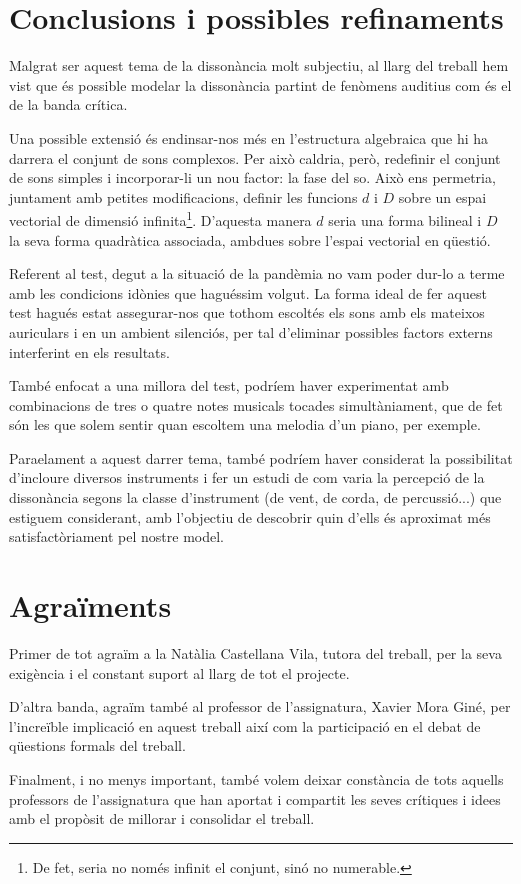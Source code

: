 \documentclass{article}
\theoremstyle{math}
\theoremstyle{TheoremNum}
\newcommand{\0}{\ensuremath{\vb{0}}}
\begin{document}
\section{Conclusions i possibles refinaments}
Malgrat ser aquest tema de la dissonància molt subjectiu, al llarg del treball hem vist que és possible modelar la dissonància partint de fenòmens auditius com és el de la banda crítica.\par
Una possible extensió és endinsar-nos més en l'estructura algebraica que hi ha darrera el conjunt de sons complexos. Per això caldria, però, redefinir el conjunt de sons simples i incorporar-li un nou factor: la fase del so. Això ens permetria, juntament amb petites modificacions, definir les funcions $d$ i $D$ sobre un espai vectorial de dimensió infinita\footnote{De fet, seria no només infinit el conjunt, sinó no numerable.}. D'aquesta manera $d$ seria una forma bilineal i $D$ la seva forma quadràtica associada, ambdues sobre l'espai vectorial en qüestió.\par
Referent al test, degut a la situació de la pandèmia no vam poder dur-lo a terme amb les condicions idònies que haguéssim volgut. La forma ideal de fer aquest test hagués estat assegurar-nos que tothom escoltés els sons amb els mateixos auriculars i en un ambient silenciós, per tal d'eliminar possibles factors externs interferint en els resultats.\par
També enfocat a una millora del test, podríem haver experimentat amb combinacions de tres o quatre notes musicals tocades simultàniament, que de fet són les que solem sentir quan escoltem una melodia d'un piano, per exemple. \par Para\lgem elament a aquest darrer tema, també podríem haver considerat la possibilitat d'incloure diversos instruments i fer un estudi de com varia la percepció de la dissonància segons la classe d'instrument (de vent, de corda, de percussió...) que estiguem considerant, amb l'objectiu de descobrir quin d'ells és aproximat més satisfactòriament pel nostre model.
\section{Agraïments}
Primer de tot agraïm a la Natàlia Castellana Vila, tutora del treball, per la seva exigència i el constant suport al llarg de tot el projecte. \par
D'altra banda, agraïm també al professor de l'assignatura, Xavier Mora Giné, per l'increïble implicació en aquest treball així com la participació en el debat de qüestions formals del treball.\par 
Finalment, i no menys important, també volem deixar constància de tots aquells professors de l'assignatura que han aportat i compartit les seves crítiques i idees amb el propòsit de millorar i consolidar el treball. 
\printbibliography[heading=bibintoc]
\appendix
\end{document}
